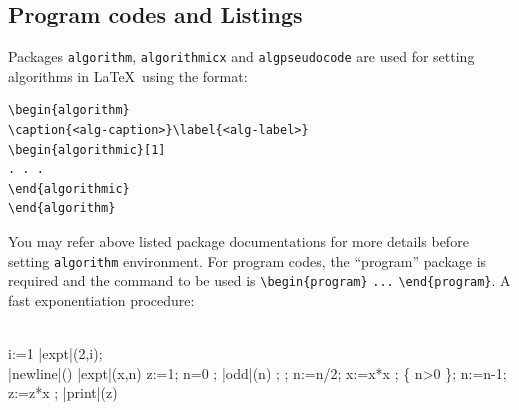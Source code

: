 \documentclass{article}
\begin{document}
\subsection{Program codes and Listings}\label{sec7}

Packages \verb+algorithm+, \verb+algorithmicx+ and \verb+algpseudocode+ are used for setting algorithms in \LaTeX\ using the format:

\bigskip
\begin{verbatim}
\begin{algorithm}
\caption{<alg-caption>}\label{<alg-label>}
\begin{algorithmic}[1]
. . .
\end{algorithmic}
\end{algorithm}
\end{verbatim}
\bigskip

You may refer above listed package documentations for more details before setting \verb+algorithm+ environment. For program codes, the ``program'' package is required and the command to be used is \verb+\begin{program}+ \verb+...+ \verb+\end{program}+. A fast exponentiation procedure:

\begin{program}
\BEGIN \\ %
  \FOR i:=1   \DO
     |expt|(2,i); \\ |newline|() \OD %
\WHERE
\PROC |expt|(x,n) \BODY
          z:=1;
          \DO \IF n=0 \THEN \EXIT \FI;
             \DO \IF |odd|(n) \THEN \EXIT \FI;
;
                n:=n/2; x:=x*x \OD;
             \{ n>0 \};
             n:=n-1; z:=z*x \OD;
          |print|(z) \ENDPROC
\END
\end{program}
\end{document}
